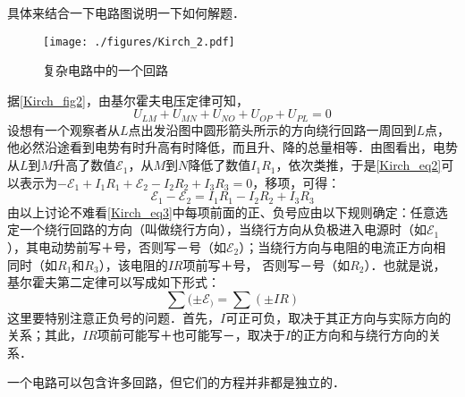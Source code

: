具体来结合一下电路图说明一下如何解题．
\begin{figure}[ht]
\centering
\texttt{[image: ./figures/Kirch\_2.pdf]}
\caption{复杂电路中的一个回路} \label{Kirch_fig2}
\end{figure}

据\autoref{Kirch_fig2}，由基尔霍夫电压定律可知，
\begin{equation} \label{Kirch_eq2}
U_{L M}+U_{M N}+U_{N O}+U_{O P}+U_{P L}=0
\end{equation}
设想有一个观察者从$L$点出发沿图中圆形箭头所示的方向绕行回路一周回到$L $点，他必然沿途看到电势有时升高有时降低，而且升、降的总量相等．由图看出，电势从$L $到$M $升高了数值$\mathscr E_1$，从$M $到$N $降低了数值$I_1R_1$，依次类推，于是\autoref{Kirch_eq2}可以表示为$-\mathscr{E}_{1}+I_{1} R_{1}+\mathscr{E}_{2}-I_{2} R_{2}+I_{3} R_{3}=0$，移项，可得：
\begin{equation} \label{Kirch_eq3}
\mathscr{E}_{1}-\mathscr{E}_{2}=I_{1} R_{1}-I_{2} R_{2}+I_{3} R_{3}
\end{equation}
由以上讨论不难看\autoref{Kirch_eq3}中每项前面的正、负号应由以下规则确定：任意选定一个绕行回路的方向（叫做绕行方向），当绕行方向从负极进入电源时（如$\mathscr E_1$），其电动势前写$＋ $号，否则写$－$号（如$\mathscr
E_2$）；当绕行方向与电阻的电流正方向相同时（如$R_1$和$R_3$），该电阻的$IR $项前写$＋$号， 否则写$－$号（如$R_2$）．也就是说，基尔霍夫第二定律可以写成如下形式：
\begin{equation}
\sum (\pm \mathscr E_)=\sum (\pm IR)
\end{equation}
这里要特别注意正负号的问题．首先，$I$可正可负，取决于其正方向与实际方向的关系；其此，$IR $项前可能写$＋$也可能写$－$，取决于$I$的正方向和与绕行方向的关系．

一个电路可以包含许多回路，但它们的方程并非都是独立的．